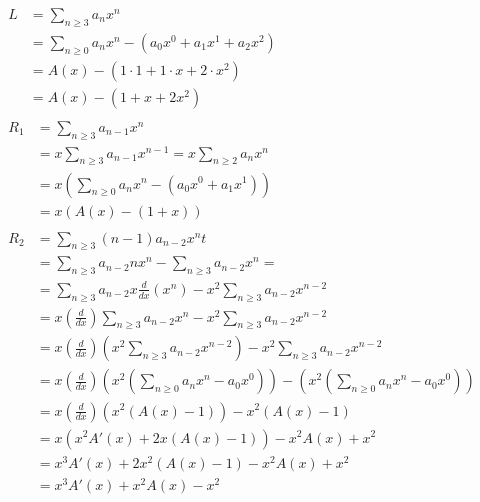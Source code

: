 \documentclass[stu, 11pt, a4paper, floatsintext]{apa7}
\begin{document}
	\begin{align}
		\begin{split}
			\label{eq07:conf_numbers_recurrence_l}
			L & =\sum_{n\geq 3}a_nx^n \\
			& =\sum_{n\geq 0}a_nx^n-\left(a_0x^0+a_1x^1+a_2x^2\right) \\
			& =A(x)-(1\cdot1+1\cdot x+2\cdot x^2) \\
			& =A(x)-\left(1+x+2x^2\right)
		\end{split}\\
		\begin{split}
			\label{eq08:conf_numbers_recurrence_r1}
			R_1 & =\sum_{n\geq 3}a_{n-1}x^n \\
			& =x\sum_{n\geq 3}a_{n-1}x^{n-1}=x\sum_{n\geq 2}a_nx^n \\
			& =x\left(\sum_{n\geq 0}a_nx^n-\left(a_0x^0+a_1x^1\right)\right) \\
			& =x\left(A(x)-(1+x)\right)
		\end{split}\\
		\begin{split}
			\label{eq09:conf_numbers_recurrence_r2}
			R_2 & =\sum_{n\geq 3}(n-1)a_{n-2}x^nt \\
			& =\sum_{n\geq 3}a_{n-2}nx^n-\sum_{n\geq 3}a_{n-2}x^n= \\
			& =\sum_{n\geq 3}a_{n-2}x\frac{d}{dx}\left(x^n\right)-x^2\sum_{n\geq 3}a_{n-2}x^{n-2} \\
			& =x(\frac{d}{dx})\sum_{n\geq 3}a_{n-2}x^n-x^2\sum_{n\geq 3}a_{n-2}x^{n-2} \\
			& =x(\frac{d}{dx})\left(x^2\sum_{n\geq 3}a_{n-2}x^{n-2}\right)-x^2\sum_{n\geq 3}a_{n-2}x^{n-2} \\
			& =x(\frac{d}{dx})\left(x^2\left(\sum_{n\geq 0}a_nx^n-a_0x^0\right)\right)-\left(x^2\left(\sum_{n\geq 0}a_nx^n-a_0x^0\right)\right) \\
			& =x(\frac{d}{dx})\left(x^2\left(A(x)-1\right)\right)-x^2\left(A(x)-1\right) \\
			& =x\left(x^2A'(x)+2x\left(A(x)-1\right)\right)-x^2A(x)+x^2 \\
			& =x^3A'(x)+2x^2\left(A(x)-1\right)-x^2A(x)+x^2 \\
			& =x^3A'(x)+x^2A(x)-x^2
		\end{split}
	\end{align}
\end{document}
